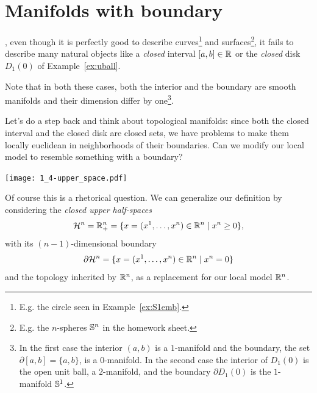 \section{Manifolds with boundary}\label{sec:mbnd}

, even though it is perfectly good to describe curves\footnote{E.g. the circle seen in Example~\ref{ex:S1emb}.} and surfaces\footnote{E.g. the $n$-spheres $\mathbb{S}^n$ in the homework sheet.}, it fails to describe many natural objects like a \emph{closed} interval $[a,b]\in\mathbb{R}$ or the \emph{closed} disk $D_1(0)$ of Example~\ref{ex:uball}.

Note that in both these cases, both the interior and the boundary are smooth manifolds and their dimension differ by one\footnote{In the first case the interior $(a,b)$ is a $1$-manifold and the boundary, the set $\partial[a,b] = \{a,b\}$, is a $0$-manifold. In the second case the interior of $D_1(0)$ is the open unit ball, a $2$-manifold, and the boundary $\partial D_1(0)$ is the $1$-manifold $\mathbb{S}^1$.}.

Let's do a step back and think about topological manifolds: since both the closed interval and the closed disk are closed sets, we have problems to make them locally euclidean in neighborhoods of their boundaries.
Can we modify our local model to resemble something with a boundary?

\begin{marginfigure}
  \texttt{[image: 1\_4-upper\_space.pdf]}
\end{marginfigure}
Of course this is a rhetorical question.
We can generalize our definition by considering the \emph{closed upper half-spaces}
\begin{equation}
  \mathcal{H}^n = \mathbb{R}_+^n = \{x=(x^1, \ldots, x^n)\in\mathbb{R}^n\mid x^n \geq 0\},
\end{equation}
with its $(n-1)$-dimensional boundary
\begin{equation}
  \partial\mathcal{H}^n = \{x=(x^1, \ldots, x^n)\in\mathbb{R}^n\mid x^n = 0\}
\end{equation}
and the topology inherited by $\mathbb{R}^n$, as a replacement for our local model $\mathbb{R}^n$.

